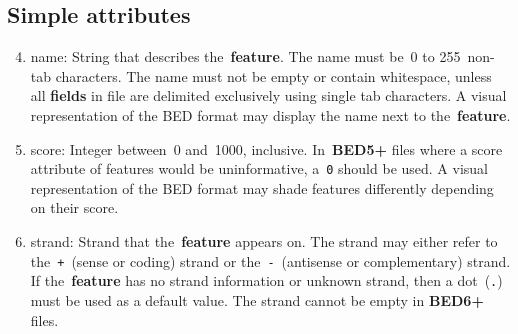 \documentclass[11pt]{article}
\begin{document}
\subsection{Simple attributes}
\begin{enumerate}
  \setcounter{enumi}{3}

\item \textsf{name}: String that describes the~\textbf{feature}.
  The name must be~0 to 255~non-tab characters.
  The name must not be empty or contain whitespace, unless all \textbf{fields} in file are delimited exclusively using single tab characters.
  A visual representation of the \ac{BED} format may display the name next to the~\textbf{feature}.

\item \textsf{score}: Integer between~0 and~1000, inclusive.
  In~\textbf{BED5+} files where a score attribute of features would be uninformative, a~\texttt{0} should be used.
  A visual representation of the \ac{BED} format may shade features differently depending on their score.

\item \textsf{strand}: Strand that the~\textbf{feature} appears on.
  The strand may either refer to the~\texttt{+}~(sense or coding) strand or the~\texttt{-}~(antisense or complementary) strand.
  If the~\textbf{feature} has no strand information or unknown strand, then a dot~(\texttt{.}) must be used as a default value.
  The strand cannot be empty in \textbf{BED6+} files.
\end{enumerate}
\end{document}
